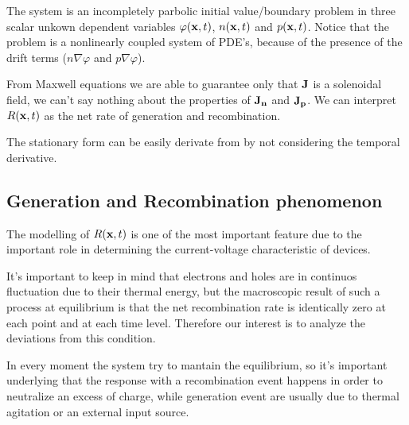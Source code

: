 The system is an incompletely parbolic initial value/boundary problem in three scalar unkown dependent variables $\varphi(\mathbf{x},t)$, $n(\mathbf{x},t)$ and $p(\mathbf{x},t)$. Notice that the problem is a nonlinearly coupled system of PDE's, because of the presence of the drift terms ($n\nabla \varphi$ and $p \nabla 	\varphi$). 

From Maxwell equations we are able to guarantee only that $\mathbf{J}$ is a solenoidal field, we can't say nothing about the properties of $\mathbf{J_n}$ and $\mathbf{J_p}$. We can interpret $R(\mathbf{x},t)$ as the net rate of generation and recombination.

The stationary form can be easily derivate from  by not considering the temporal derivative.





\subsection{Generation and Recombination phenomenon}
\label{subsection: RG}

The modelling of $R(\mathbf{x},t)$ is one of the most important feature due to the important role in determining the current-voltage characteristic of devices.
 
It's important to keep in mind that electrons and holes are in continuos fluctuation due to their thermal energy, but the macroscopic result of such a process at equilibrium is that the net recombination rate is identically zero at each point and at each time level. Therefore our interest is to analyze the deviations from this condition. 

In every moment the system try to mantain the equilibrium, so it's important underlying that the response with a recombination event happens in order to neutralize an excess of charge, while generation event are usually due to thermal agitation or an external input source.

